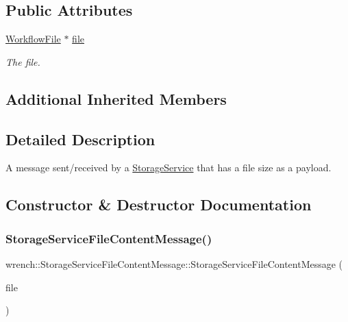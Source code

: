 \subsection*{Public Attributes}
\begin{DoxyCompactItemize}
\item 
\mbox{\label{classwrench_1_1_storage_service_file_content_message_a8bef9d31c075e0dc9b28cbcfcc31eaf3}} 
\hyperlink{classwrench_1_1_workflow_file}{Workflow\+File} $\ast$ \hyperlink{classwrench_1_1_storage_service_file_content_message_a8bef9d31c075e0dc9b28cbcfcc31eaf3}{file}
\begin{DoxyCompactList}\small\item\em The file. \end{DoxyCompactList}\end{DoxyCompactItemize}
\subsection*{Additional Inherited Members}


\subsection{Detailed Description}
A message sent/received by a \hyperlink{classwrench_1_1_storage_service}{Storage\+Service} that has a file size as a payload. 

\subsection{Constructor \& Destructor Documentation}
\mbox{\label{classwrench_1_1_storage_service_file_content_message_a9994d2e7b1cc0358a2f971730c437ee4}} 
\subsubsection{\texorpdfstring{Storage\+Service\+File\+Content\+Message()}{StorageServiceFileContentMessage()}}
{\footnotesize\ttfamily wrench\+::\+Storage\+Service\+File\+Content\+Message\+::\+Storage\+Service\+File\+Content\+Message (\begin{DoxyParamCaption}\item[{\hyperlink{classwrench_1_1_workflow_file}{Workflow\+File} $\ast$}]{file }\end{DoxyParamCaption})}



